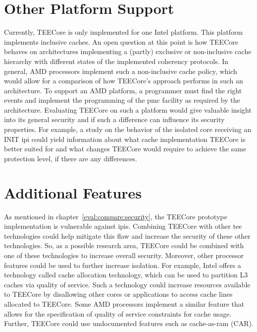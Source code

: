 \section{Other Platform Support}
Currently, TEECore is only implemented for one Intel platform. This platform
implements inclusive caches. An open question at this point is how TEECore
behaves on architectures implementing a (partly) exclusive or non-inclusive
cache hierarchy with different states of the implemented coherency protocols.
In general, AMD processors implement such a non-inclusive cache policy, which
would allow for a comparison of how TEECore's approach performs in such an
architecture. To support an AMD platform, a programmer must find the right
events and implement the programming of the \gls{pmc} facility as required by
the architecture. Evaluating TEECore on such a platform would give valuable
insight into its general security and if such a difference can influence its
security properties. For example, a study on the behavior of the isolated core
receiving an INIT \gls{ipi} could yield information about what cache
implementation TEECore is better suited for and what changes TEECore would
require to achieve the same protection level, if there are any differences.

\section{Additional Features}
As mentioned in chapter~\ref{eval:compare:security}, the TEECore prototype
implementation is vulnerable against \glspl{ipi}. Combining
TEECore with other \gls{tee} technologies could help mitigate this flaw and
increase the security of these other technologies. So, as a possible research
area, TEECore could be combined with one of these technologies to increase
overall security. Moreover, other processor features could be used to further
increase isolation. For example, Intel offers a technology called cache
allocation technology, which can be used to partition L3 caches via quality of
service. Such a technology could increase resources available to TEECore by
disallowing other cores or applications to access cache lines allocated to
TEECore. Some AMD processors implement a similar feature that allows for the
specification of quality of service constraints for cache usage. Further,
TEECore could use undocumented features such as cache-as-ram (CAR).

\cleardoublepage
